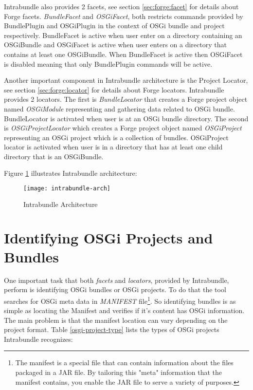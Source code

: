 Intrabundle also provides 2 facets, see section \ref{sec:forge:facet} for details about Forge facets. \emph{BundleFacet} and \emph{OSGiFacet}, both restricts commands provided by BundlePlugin and OSGiPlugin in the context of OSGi bundle and project respectively. BundleFacet is active when user enter on a directory containing an OSGiBundle and OSGiFacet is active when user enters on a directory that contains at least one OSGiBundle. When BundleFacet is active then OSGiFacet is disabled meaning that only BundlePlugin commands will be active. 

Another important component in Intrabundle architecture is the Project Locator, see section \ref{sec:forge:locator} for details about Forge locators. Intrabundle provides 2 locators. The first is \emph{BundleLocator} that creates a Forge project object named \emph{OSGiModule} representing and gathering data related to OSGi bundle. BundleLocator is activated when user is at an OSGi bundle directory. The second is \emph{OSGiProjectLocator} which creates a Forge project object named \emph{OSGiProject} representing an OSGi project which is a collection of bundles. OSGiProject locator is activated when user is in a directory that has at least one child directory that is an OSGiBundle.          

Figure \ref{intrabundle-arch} illustrates Intrabundle architecture:

\begin{figure}[h]
\caption{Intrabundle Architecture}
\label{intrabundle-arch}
\centering
\texttt{[image: intrabundle-arch]}
\end{figure}  
\FloatBarrier


\section{Identifying OSGi Projects and Bundles}
One important task that both \emph{facets} and \emph{locators}, provided by Intrabundle, perform is identifying OSGi bundles or OSGi projects. To do that the tool searches for OSGi meta data in \emph{MANIFEST} file\footnote{The manifest is a special file that can contain information about the files packaged in a JAR file. By tailoring this "meta" information that the manifest contains, you enable the JAR file to serve a variety of purposes.}. So identifying bundles is as simple as locating the Manifest and verifies if it's content has OSGi information. The main problem is that the manifest location can vary depending on the project format. Table \ref{osgi-project-type} lists the types of OSGi projects Intrabundle recognizes:     

